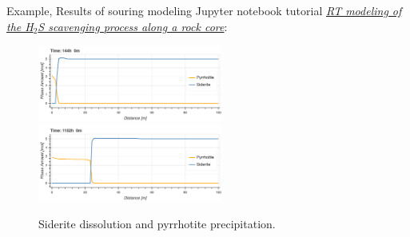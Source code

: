 \begin{frame}{Example, Results of souring modeling}	
	Jupyter notebook tutorial \href{https://github.com/mtsveta/reaktoro-jupyter/blob/master/tutorial/rt.scavenging.ipynb}{\textcolor{indigo(dye)}{\it RT modeling of the H$_2$S scavenging process along a rock core}}:
	\begin{figure}[!t]%
		\centering
		\includegraphics[width=0.54\textwidth]{figures/reactive-transport/siderite-pyrrhotite-1.png} \\
		\includegraphics[width=0.54\textwidth]{figures/reactive-transport/siderite-pyrrhotite-2.png}
		\caption{Siderite dissolution and pyrrhotite precipitation.}
	\end{figure}
\end{frame}

